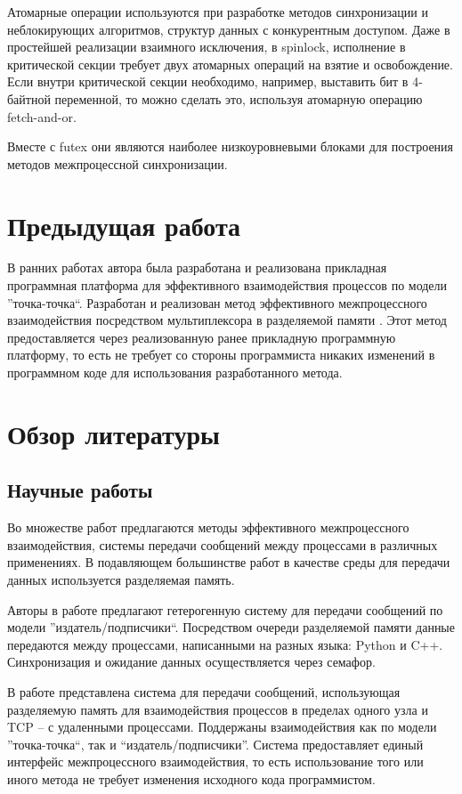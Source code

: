 Атомарные операции используются при разработке методов синхронизации и неблокирующих алгоритмов, структур данных с конкурентным доступом. Даже в простейшей реализации взаимного исключения, в spinlock, исполнение в критической секции требует двух атомарных операций на взятие и освобождение. Если внутри критической секции необходимо, например, выставить бит в 4-байтной переменной, то можно сделать это, используя атомарную операцию fetch-and-or. 

Вместе с futex они являются наиболее низкоуровневыми блоками для построения методов межпроцессной синхронизации.

\section{Предыдущая работа}

В ранних работах автора была разработана и реализована прикладная программная платформа для эффективного взаимодействия процессов \cite{GubarevKMU18} по модели ''точка-точка``. Разработан и реализован метод эффективного межпроцессного взаимодействия посредством мультиплексора в разделяемой памяти \cite{GubarevKMU20}. Этот метод предоставляется через реализованную ранее прикладную программную платформу, то есть не требует со стороны программиста никаких изменений в программном коде для использования разработанного метода.

\section{Обзор литературы}

\subsection{Научные работы}
Во множестве работ предлагаются методы эффективного межпроцессного взаимодействия, системы передачи сообщений между процессами в различных применениях. В подавляющем большинстве работ в качестве среды для передачи данных используется разделяемая память.

Авторы в работе \cite{7790679} предлагают гетерогенную систему для передачи сообщений по модели ''издатель/подписчики``. Посредством очереди разделяемой памяти данные передаются между процессами, написанными на разных языка: Python и C++. Синхронизация и ожидание данных осуществляется через семафор.

В работе \cite{ShMemTransportThesis} представлена система для передачи сообщений, использующая разделяемую память для взаимодействия процессов в пределах одного узла и TCP -- с удаленными процессами. Поддержаны взаимодействия как по модели ''точка-точка``, так и ``издатель/подписчики''. Система предоставляет единый интерфейс межпроцессного взаимодействия, то есть использование того или иного метода не требует изменения исходного кода программистом.

